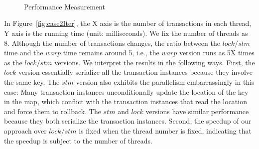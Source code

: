 \begin{figure*}
\centering
{}
\\
\\
\\
\caption{Performance Measurement}
\label{fig:perf}
\vspace{-1em}
\end{figure*}



In Figure~\ref{fig:case2Iter}, the X axis is the number of transactions in each thread, Y axis is the running time (unit: milliseconds). We fix the number of threads as 8. Although the number of transactions changes, the ratio between the $lock/stm$ time and the $warp$ time remains around 5, i.e., the $warp$ version runs as  5X times as the $lock/stm$ versions. We interpret the results in the following ways. First, the $lock$ version essentially serialize all the transaction instances because they involve the same key. The $stm$ version also exhibits the  parallelism embarrassingly in this case: Many transaction instances unconditionally update the location of the key in the map, which conflict with the transaction instances that read the location and force them to rollback. The $stm$ and $lock$ versions have similar performance because they  both serialize the transaction instances. Second, the speedup of our approach over $lock/stm$ is fixed when the thread number is fixed, indicating that the speedup is subject to the number of threads. 



